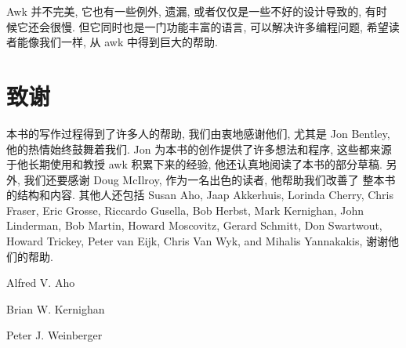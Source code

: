 Awk 并不完美, 它也有一些例外, 遗漏, 或者仅仅是一些不好的设计导致的, 有时
候它还会很慢. 但它同时也是一门功能丰富的语言, 可以解决许多编程问题,
希望读者能像我们一样, 从 awk 中得到巨大的帮助.

\section*{致谢}
本书的写作过程得到了许多人的帮助, 我们由衷地感谢他们, 尤其是 Jon Bentley,
他的热情始终鼓舞着我们. Jon 为本书的创作提供了许多想法和程序, 这些都来源
于他长期使用和教授 awk 积累下来的经验, 他还认真地阅读了本书的部分草稿.
另外, 我们还要感谢 Doug McIlroy, 作为一名出色的读者, 他帮助我们改善了
整本书的结构和内容. 其他人还包括 Susan Aho, Jaap Akkerhuis, Lorinda
Cherry, Chris Fraser, Eric Grosse, Riccardo Gusella, Bob Herbst, Mark
Kernighan, John Linderman, Bob Martin, Howard Moscovitz, Gerard Schmitt,
Don Swartwout, Howard Trickey, Peter van Eijk, Chris Van Wyk, and Mihalis
Yannakakis, 谢谢他们的帮助.

\begin{flushright}
Alfred V. Aho\par
Brian W. Kernighan \par
Peter J. Weinberger
\end{flushright}
